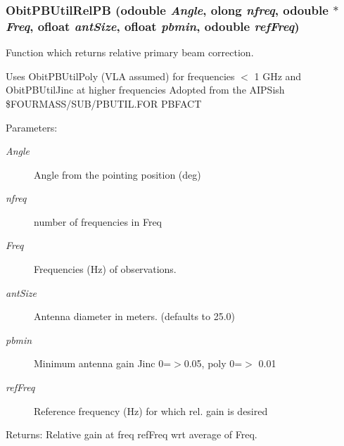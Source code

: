 \subsubsection{ Obit\-PBUtil\-Rel\-PB ({\bf odouble} {\em Angle}, {\bf olong} {\em nfreq}, {\bf odouble} $\ast$ {\em Freq}, {\bf ofloat} {\em ant\-Size}, {\bf ofloat} {\em pbmin}, {\bf odouble} {\em ref\-Freq})}\label{ObitPBUtil_8h_a2}


Function which returns relative primary beam correction. 

Uses Obit\-PBUtil\-Poly (VLA assumed) for frequencies $<$ 1 GHz and Obit\-PBUtil\-Jinc at higher frequencies Adopted from the AIPSish \$FOURMASS/SUB/PBUTIL.FOR PBFACT \begin{Desc}
\item[Parameters:]
\begin{description}
\item[{\em Angle}]Angle from the pointing position (deg) \item[{\em nfreq}]number of frequencies in Freq \item[{\em Freq}]Frequencies (Hz) of observations. \item[{\em ant\-Size}]Antenna diameter in meters. (defaults to 25.0) \item[{\em pbmin}]Minimum antenna gain Jinc 0=$>$0.05, poly 0=$>$ 0.01 \item[{\em ref\-Freq}]Reference frequency (Hz) for which rel. gain is desired \end{description}
\end{Desc}
\begin{Desc}
\item[Returns:]Relative gain at freq ref\-Freq wrt average of Freq. \end{Desc}
